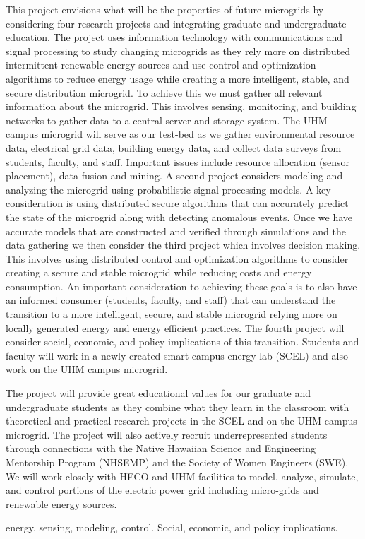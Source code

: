 \documentclass{proposalnsf}
\begin{document}
  This project envisions what  will be the properties of future
microgrids by considering four research projects and integrating graduate and undergraduate
education.  The project uses information technology with communications and signal processing
to study changing microgrids  as they rely more on distributed intermittent renewable energy sources and use control and optimization algorithms to reduce  energy usage while creating  a 
more intelligent, stable, and secure distribution microgrid.  To achieve this we must gather all
relevant information about the microgrid.  This involves sensing, monitoring, and building networks
to gather data to a central server and storage system.   The UHM campus microgrid will serve
as our test-bed as we gather environmental resource data, electrical grid data,  building energy
data, and collect data surveys from students, faculty, and staff.   Important issues include resource allocation (sensor placement), data fusion and mining.   A second project considers modeling and
analyzing the microgrid using probabilistic signal processing models.  A key consideration is using
distributed secure algorithms that can accurately predict  the state of the microgrid along with
detecting anomalous events.  Once we have accurate models that are constructed and verified
through simulations and the data gathering we then consider the third project which involves
decision making.   This involves using distributed control and optimization algorithms to
consider creating a secure and stable microgrid while reducing costs and energy consumption.
An important consideration to achieving these goals is to also have an informed consumer
(students, faculty, and staff) that can understand the transition to a more intelligent, secure,
and stable microgrid relying more on locally generated energy and energy efficient practices.
The fourth project will consider social, economic, and policy implications of this transition.
Students and faculty will work in a newly created smart campus energy lab (SCEL) and also
work on the UHM campus microgrid.

The project will provide great educational values for our graduate  and undergraduate students as they combine what they learn in the classroom  with theoretical and practical research projects in the SCEL and on the UHM campus microgrid. The project will also actively recruit underrepresented students through connections with the Native Hawaiian Science and Engineering Mentorship Program (NHSEMP) and the Society of Women Engineers (SWE).  We will work closely with HECO and UHM facilities to model, analyze, simulate, and control portions of the electric power grid including micro-grids and renewable energy sources.

\medskip

 energy, sensing, modeling, control. Social, economic,
and policy implications.
\end{document}
